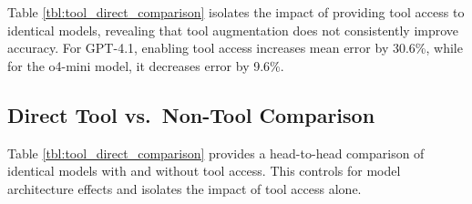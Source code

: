 Table \ref{tbl:tool_direct_comparison} isolates the impact of providing
tool access to identical models, revealing that tool augmentation does
not consistently improve accuracy. For GPT-4.1, enabling tool access
increases mean error by 30.6\%, while for the o4-mini model, it
decreases error by 9.6\%.

\subsection{Direct Tool vs.~Non-Tool
Comparison}\label{d.1-direct-tool-vs.-non-tool-comparison}

Table \ref{tbl:tool_direct_comparison} provides a head-to-head
comparison of identical models with and without tool access. This
controls for model architecture effects and isolates the impact of tool
access alone.

